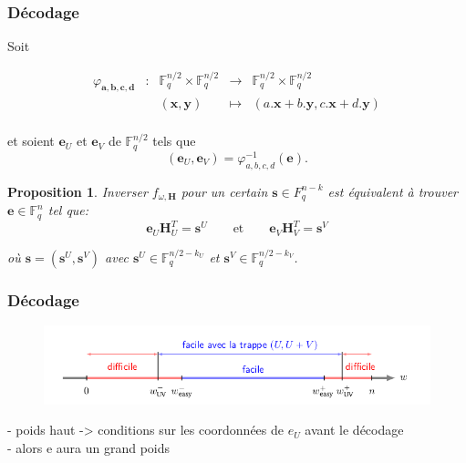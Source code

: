 \documentclass[10pt,a4paper]{beamer}
\theoremstyle{plain}
\newtheorem{propo}[thm]{Proposition}
\theoremstyle{definition}
\newcommand{\F}{\mathbb{F}}
\begin{document}
\begin{frame}
\frametitle{Décodage}
Soit 

$$\begin{array}{ccccc}
\varphi_{\mathbf{a},\mathbf{b},\mathbf{c},\mathbf{d}} & : & \F_q^{n/2} \times  \F_q^{n/2} & \to & \F_q^{n/2} \times  \F_q^{n/2} \\
 & & (\mathbf{x} , \mathbf{y}) & \mapsto &  (a.\mathbf{x} + b.\mathbf{y}, c.\mathbf{x} + d.\mathbf{y}) \\
\end{array}$$


et soient $\mathbf{e}_U$ et $\mathbf{e}_V$ de $\F_q^{n/2}$ tels que 
$$ (\mathbf{e}_U,\mathbf{e}_V) = \varphi^{-1}_{a,b,c,d}(\mathbf{e}).$$

\begin{propo} Inverser $f_{\omega,\mathbf{H}}$ pour un certain $\mathbf{s} \in F_q^{n-k}$ est équivalent à trouver $\mathbf{e} \in \F_q^n$ tel que:
$$ \mathbf{e}_U\mathbf{H}_U^T = \mathbf{s}^U \qquad \text{et} \qquad \mathbf{e}_V\mathbf{H}_V^T = \mathbf{s}^V $$

\vspace{0.1in}
où $\mathbf{s} = (\mathbf{s}^U, \mathbf{s}^V)$ avec $\mathbf{s}^U \in \F_q^{n/2-k_U}$ et $\mathbf{s}^V \in \F_q^{n/2-k_V}$.
\end{propo}

\end{frame}

\begin{frame}
\frametitle{Décodage}
\vspace{-1in}
\begin{figure}
\begin{center}
\includegraphics [scale=0.4]{schema.png}
\end{center}
\end{figure}

- poids haut -> conditions sur les coordonnées de $e_U$ avant le décodage\\
- alors e aura un grand poids
\end{frame}
\end{document}
